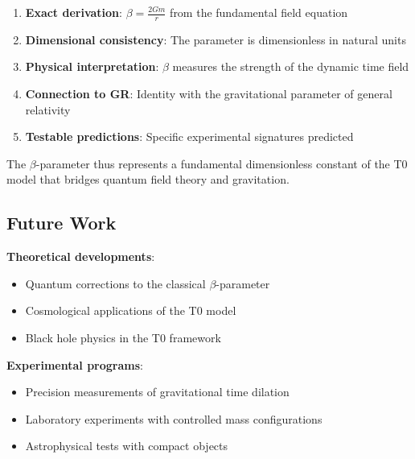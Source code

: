 \documentclass[12pt,a4paper]{article}
\begin{document}
	\begin{tcolorbox}[colback=green!5!white,colframe=green!75!black,title=Main Results]
		\begin{enumerate}
			\item \textbf{Exact derivation}: $\beta = \frac{2Gm}{r}$ from the fundamental field equation
			\item \textbf{Dimensional consistency}: The parameter is dimensionless in natural units
			\item \textbf{Physical interpretation}: $\beta$ measures the strength of the dynamic time field
			\item \textbf{Connection to GR}: Identity with the gravitational parameter of general relativity
			\item \textbf{Testable predictions}: Specific experimental signatures predicted
		\end{enumerate}
	\end{tcolorbox}
	
	The $\beta$-parameter thus represents a fundamental dimensionless constant of the T0 model that bridges quantum field theory and gravitation.
	
	\subsection{Future Work}
	\label{subsec:future_work}
	
	\textbf{Theoretical developments}:
	\begin{itemize}
		\item Quantum corrections to the classical $\beta$-parameter
		\item Cosmological applications of the T0 model
		\item Black hole physics in the T0 framework
	\end{itemize}
	
	\textbf{Experimental programs}:
	\begin{itemize}
		\item Precision measurements of gravitational time dilation
		\item Laboratory experiments with controlled mass configurations
		\item Astrophysical tests with compact objects
	\end{itemize}
	
\end{document}

